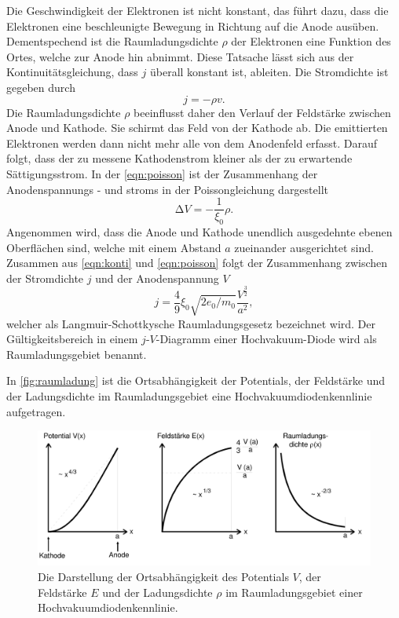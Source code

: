 Die Geschwindigkeit der Elektronen ist nicht konstant, das führt dazu, dass die Elektronen
eine beschleunigte Bewegung in Richtung auf die Anode ausüben. Dementspechend ist die Raumladungsdichte $\rho$
der Elektronen eine Funktion des Ortes, welche zur Anode hin abnimmt.  Diese Tatsache lässt sich aus der Kontinuitätsgleichung, dass $j$ überall konstant ist,
ableiten.
Die Stromdichte ist gegeben durch
\begin{equation}
    j = - \rho v .
\label{eqn:konti}
\end{equation}
Die Raumladungsdichte $\rho$ beeinflusst daher den Verlauf der Feldstärke zwischen Anode und Kathode.
Sie schirmt das Feld von der Kathode ab. Die emittierten Elektronen werden dann nicht mehr alle von dem
Anodenfeld erfasst. Darauf folgt, dass der zu messene Kathodenstrom kleiner als der zu erwartende Sättigungsstrom.
In der \autoref{eqn:poisson} ist der Zusammenhang der Anodenspannungs - und stroms in der Poissongleichung dargestellt
\begin{equation}
    \increment V = - \frac{1}{\xi_0}\rho .
    \label{eqn:poisson}
\end{equation} 
Angenommen wird, dass die Anode und Kathode unendlich ausgedehnte ebenen Oberflächen sind, welche
mit einem Abstand $a$ zueinander ausgerichtet sind.
Zusammen aus \autoref{eqn:konti} und \autoref{eqn:poisson} folgt der Zusammenhang
zwischen der Stromdichte $j$ und der Anodenspannung $V$
\begin{equation}
    j = \frac{4}{9} \xi_0 \sqrt{2 e_0/m_0} \frac{V^{\frac{3}{2}}}{a^2} ,
\label{eqn:langmuir}
\end{equation}
welcher als Langmuir-Schottkysche Raumladungsgesetz bezeichnet wird. Der Gültigkeitsbereich 
in einem $j$-$V$-Diagramm einer Hochvakuum-Diode wird als Raumladungsgebiet benannt.

In \autoref{fig:raumladung} ist die Ortsabhängigkeit der Potentials, der Feldstärke und der Ladungsdichte im Raumladungsgebiet
eine Hochvakuumdiodenkennlinie aufgetragen.

\begin{figure}[H]
    \centering
    \includegraphics[width=0.5\linewidth]{content/grafik/raumladung.png}
    \caption{Die Darstellung der Ortsabhängigkeit des Potentials $V$, der Feldstärke $E$ und der Ladungsdichte $\rho$ im
    Raumladungsgebiet einer Hochvakuumdiodenkennlinie.\cite{elektron}}
    \label{fig:raumladung}
\end{figure}

